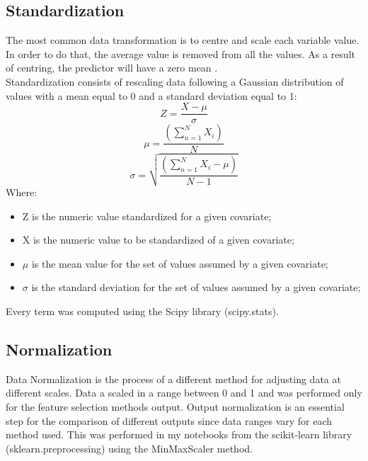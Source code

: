 \subsection{Standardization}
The most common data transformation is to centre and scale each variable value. In order to do that, the average value is removed from all the values. As a result of centring, the predictor will have a zero mean \cite{kuhn2013applied}.\\
Standardization consists of rescaling data following a Gaussian distribution of values with a mean equal to 0 and a standard deviation equal to 1:
\begin{equation}
  Z = \frac{X-\mu}{\sigma}
\end{equation}
\begin{equation}
\mu = \frac{(\sum_{n=1}^{N} X_i)}{N}
\end{equation}
\begin{equation}
\sigma = \sqrt{\frac{(\sum_{n=1}^{N} X_i-\mu)}{N-1}}
\end{equation}
Where:
\begin{itemize}
\item Z is the numeric value standardized for a given covariate;
\item X is the numeric value to be standardized of a given covariate;
\item $\mu$ is the mean value for the set of values assumed by a given covariate;
\item $\sigma$ is the standard deviation for the set of values assumed by a given covariate;
\end{itemize}
Every term was computed using the Scipy library (scipy.stats). 
\bigbreak
\subsection{Normalization}
Data Normalization is the process of a different method for adjusting data at different scales. Data a scaled in a range between 0 and 1 and was performed only for the feature selection methods output.
Output normalization is an essential step for the comparison of different outputs since data ranges vary for each method used.\newline
This was performed in my notebooks from the scikit-learn library (sklearn.preprocessing) using the MinMaxScaler method.
